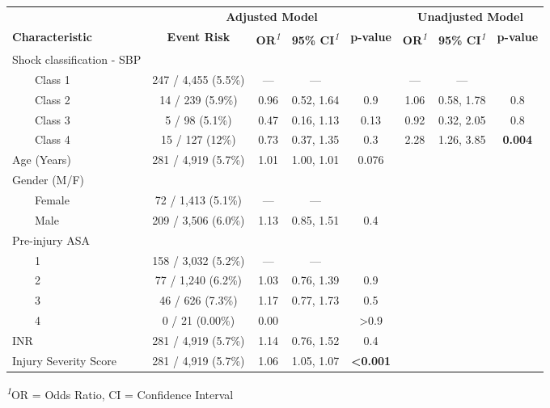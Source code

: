 \documentclass[
]{article}
\begin{document}
\begin{table}[!t]
\fontsize{12.0pt}{14.4pt}\selectfont
\begin{tabular*}{\linewidth}{@{\extracolsep{\fill}}lccccccc}
\toprule
 & \multicolumn{4}{c}{\textbf{Adjusted Model}} & \multicolumn{3}{c}{\textbf{Unadjusted Model}} \\ 
\cmidrule(lr){2-5} \cmidrule(lr){6-8}
\textbf{Characteristic} & \textbf{Event Risk} & \textbf{OR}\textsuperscript{\textit{1}} & \textbf{95\% CI}\textsuperscript{\textit{1}} & \textbf{p-value} & \textbf{OR}\textsuperscript{\textit{1}} & \textbf{95\% CI}\textsuperscript{\textit{1}} & \textbf{p-value} \\ 
\midrule\addlinespace[2.5pt]
Shock classification - SBP &  &  &  &  &  &  &  \\ 
    Class 1 & 247 / 4,455 (5.5\%) & — & — &  & — & — &  \\ 
    Class 2 & 14 / 239 (5.9\%) & 0.96 & 0.52, 1.64 & 0.9 & 1.06 & 0.58, 1.78 & 0.8 \\ 
    Class 3 & 5 / 98 (5.1\%) & 0.47 & 0.16, 1.13 & 0.13 & 0.92 & 0.32, 2.05 & 0.8 \\ 
    Class 4 & 15 / 127 (12\%) & 0.73 & 0.37, 1.35 & 0.3 & 2.28 & 1.26, 3.85 & {\bfseries 0.004} \\ 
Age (Years) & 281 / 4,919 (5.7\%) & 1.01 & 1.00, 1.01 & 0.076 &  &  &  \\ 
Gender (M/F) &  &  &  &  &  &  &  \\ 
    Female & 72 / 1,413 (5.1\%) & — & — &  &  &  &  \\ 
    Male & 209 / 3,506 (6.0\%) & 1.13 & 0.85, 1.51 & 0.4 &  &  &  \\ 
Pre-injury ASA &  &  &  &  &  &  &  \\ 
    1 & 158 / 3,032 (5.2\%) & — & — &  &  &  &  \\ 
    2 & 77 / 1,240 (6.2\%) & 1.03 & 0.76, 1.39 & 0.9 &  &  &  \\ 
    3 & 46 / 626 (7.3\%) & 1.17 & 0.77, 1.73 & 0.5 &  &  &  \\ 
    4 & 0 / 21 (0.00\%) & 0.00 &  & >0.9 &  &  &  \\ 
INR & 281 / 4,919 (5.7\%) & 1.14 & 0.76, 1.52 & 0.4 &  &  &  \\ 
Injury Severity Score & 281 / 4,919 (5.7\%) & 1.06 & 1.05, 1.07 & {\bfseries <0.001} &  &  &  \\ 
\bottomrule
\end{tabular*}
\begin{minipage}{\linewidth}
\textsuperscript{\textit{1}}OR = Odds Ratio, CI = Confidence Interval\\
\end{minipage}
\end{table}
\end{document}
